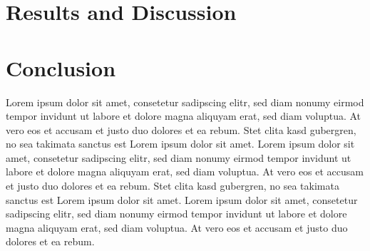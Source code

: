 \documentclass{vgtc}
\begin{document}
\section{Results and Discussion}\label{sec:resDisc}
\section{Conclusion}\label{sec:conc}

Lorem ipsum dolor sit amet, consetetur sadipscing elitr, sed diam
nonumy eirmod tempor invidunt ut labore et dolore magna aliquyam erat,
sed diam voluptua. At vero eos et accusam et justo duo dolores et ea
rebum. Stet clita kasd gubergren, no sea takimata sanctus est Lorem
ipsum dolor sit amet. Lorem ipsum dolor sit amet, consetetur
sadipscing elitr, sed diam nonumy eirmod tempor invidunt ut labore et
dolore magna aliquyam erat, sed diam voluptua. At vero eos et accusam
et justo duo dolores et ea rebum. Stet clita kasd gubergren, no sea
takimata sanctus est Lorem ipsum dolor sit amet. Lorem ipsum dolor sit
amet, consetetur sadipscing elitr, sed diam nonumy eirmod tempor
invidunt ut labore et dolore magna aliquyam erat, sed diam
voluptua. At vero eos et accusam et justo duo dolores et ea
rebum.



%

%
%
%


\end{document}
